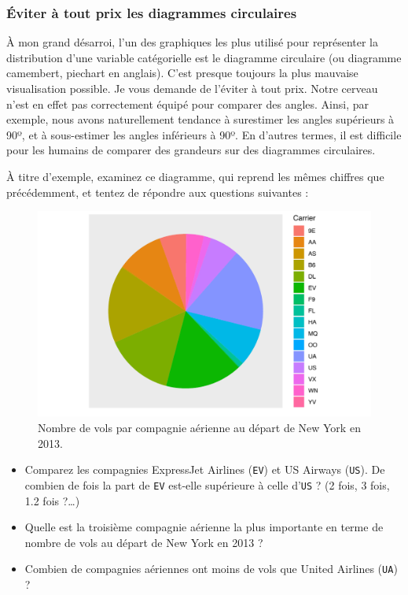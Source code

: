 \documentclass[a4paperpaper,]{article}
\providecommand{\tightlist}{%
  \setlength{\itemsep}{0pt}\setlength{\parskip}{0pt}}
\begin{document}
\hypertarget{eviter-a-tout-prix-les-diagrammes-circulaires}{%
\subsubsection{Éviter à tout prix les diagrammes circulaires}\label{eviter-a-tout-prix-les-diagrammes-circulaires}}

À mon grand désarroi, l'un des graphiques les plus utilisé pour représenter la distribution d'une variable catégorielle est le diagramme circulaire (ou diagramme camembert, piechart en anglais). C'est presque toujours la plus mauvaise visualisation possible. Je vous demande de l'éviter à tout prix. Notre cerveau n'est en effet pas correctement équipé pour comparer des angles. Ainsi, par exemple, nous avons naturellement tendance à surestimer les angles supérieurs à 90º, et à sous-estimer les angles inférieurs à 90º. En d'autres termes, il est difficile pour les humains de comparer des grandeurs sur des diagrammes circulaires.

À titre d'exemple, examinez ce diagramme, qui reprend les mêmes chiffres que précédemment, et tentez de répondre aux questions suivantes :

\begin{figure}[htpb]

{\centering \includegraphics[width=0.9\linewidth]{figure/piechart-1} 

}

\caption{Nombre de vols par compagnie aérienne au départ de New York en 2013.}\label{fig:piechart}
\end{figure}

\begin{itemize}
\tightlist
\item
  Comparez les compagnies ExpressJet Airlines (\texttt{EV}) et US Airways (\texttt{US}). De combien de fois la part de \texttt{EV} est-elle supérieure à celle d'\texttt{US} ? (2 fois, 3 fois, 1.2 fois ?\ldots{})
\item
  Quelle est la troisième compagnie aérienne la plus importante en terme de nombre de vols au départ de New York en 2013 ?
\item
  Combien de compagnies aériennes ont moins de vols que United Airlines (\texttt{UA}) ?
\end{itemize}
\end{document}
